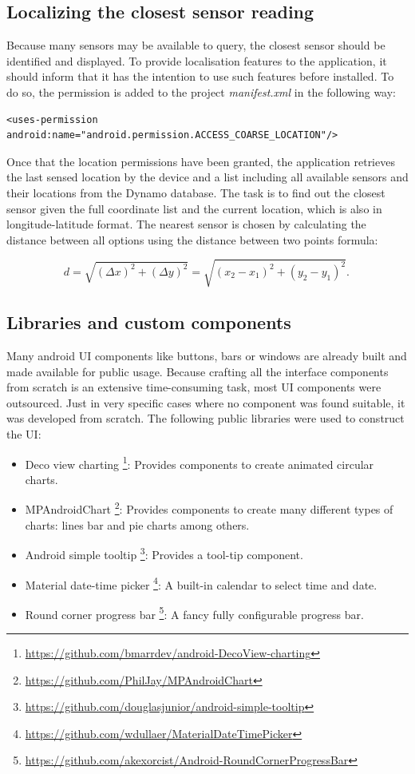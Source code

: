 \subsection{Localizing the closest sensor reading}
Because many sensors may be available to query, the closest sensor should be identified and displayed. To provide localisation features to the application, it should inform that it has the intention to use such features before installed. To do so, the permission is added to the project \textit{manifest.xml} in the following way: \bigskip

{\centering
\begin{BVerbatim}
<uses-permission android:name="android.permission.ACCESS_COARSE_LOCATION"/>
\end{BVerbatim}
\par
}
\bigskip

Once that the location permissions have been granted, the application retrieves the last sensed location by the device and a list including all available sensors and their locations from the Dynamo database. The task is to find out the closest sensor given the full coordinate list and the current location, which is also in longitude-latitude format. The nearest sensor is chosen by calculating the distance between all options using the distance between two points formula: 

\begin{equation}
d={\sqrt {(\Delta x)^{2}+(\Delta y)^{2}}}={\sqrt {(x_{2}-x_{1})^{2}+(y_{2}-y_{1})^{2}}}.\,
\end{equation}

\subsection{Libraries and custom components}
Many android UI components like buttons, bars or windows are already built and made available for public usage. Because crafting all the interface components from scratch is an extensive time-consuming task, most UI components were outsourced. Just in very specific cases where no component was found suitable, it was developed from scratch. 
The following public libraries were used to construct the UI:
\begin{itemize}
    \item Deco view charting \footnote{\url{https://github.com/bmarrdev/android-DecoView-charting}}: Provides components to create animated circular charts.
    \item MPAndroidChart \footnote{\url{https://github.com/PhilJay/MPAndroidChart}}: Provides components to create many different types of charts: lines bar and pie charts among others.
    \item Android simple tooltip \footnote{\url{https://github.com/douglasjunior/android-simple-tooltip}}: Provides a tool-tip component.
	\item Material date-time picker \footnote{\url{https://github.com/wdullaer/MaterialDateTimePicker}}: A built-in calendar to select time and date.
  \item Round corner progress bar \footnote{\url{https://github.com/akexorcist/Android-RoundCornerProgressBar}}: A fancy fully configurable progress bar.
\end{itemize}

